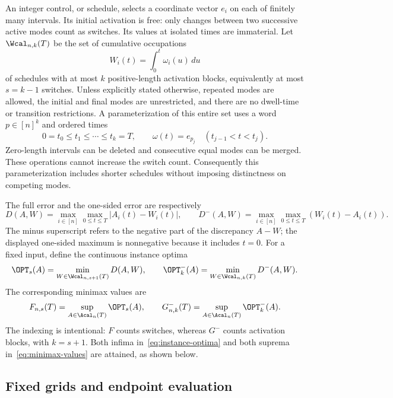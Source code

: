 An integer control, or schedule, selects a coordinate vector $e_i$ on each of
finitely many intervals. Its initial activation is free: only changes between
two successive active modes count as switches. Its values at isolated times
are immaterial. Let $\Wcal_{n,k}(T)$ be the set of cumulative occupations
\[
 W_i(t)=\int_0^t\omega_i(u)\,du
\]
of schedules with at most $k$ positive-length activation blocks, equivalently
at most $s=k-1$ switches. Unless explicitly stated otherwise, repeated modes
are allowed, the initial and final modes are unrestricted, and there are no
dwell-time or transition restrictions. A parameterization of this entire set
uses a word $p\in[n]^k$ and ordered times
\begin{equation}\label{eq:schedule-parameterization}
 0=t_0\le t_1\le\cdots\le t_k=T,\qquad
 \omega(t)=e_{p_j}\quad(t_{j-1}<t<t_j).
\end{equation}
Zero-length intervals can be deleted and consecutive equal modes can be
merged. These operations cannot increase the switch count. Consequently this
parameterization includes shorter schedules without imposing distinctness
on competing modes.

The full error and the one-sided error are respectively
\begin{equation}\label{eq:errors}
 D(A,W)=\max_{i\in[n]}\max_{0\le t\le T}|A_i(t)-W_i(t)|,
 \qquad
 D^-(A,W)=\max_{i\in[n]}\max_{0\le t\le T}(W_i(t)-A_i(t)).
\end{equation}
The minus superscript refers to the negative part of the discrepancy $A-W$;
the displayed one-sided maximum is nonnegative because it includes $t=0$.
For a fixed input, define the continuous instance optima
\begin{equation}\label{eq:instance-optima}
 \OPT_s(A)=\min_{W\in\Wcal_{n,s+1}(T)}D(A,W),\qquad
 \OPT^-_k(A)=\min_{W\in\Wcal_{n,k}(T)}D^-(A,W).
\end{equation}
The corresponding minimax values are
\begin{equation}\label{eq:minimax-values}
 F_{n,s}(T)=\sup_{A\in\Acal_n(T)}\OPT_s(A),\qquad
 G^-_{n,k}(T)=\sup_{A\in\Acal_n(T)}\OPT^-_k(A).
\end{equation}
The indexing is intentional: $F$ counts switches, whereas $G^-$ counts
activation blocks, with $k=s+1$. Both infima in~\eqref{eq:instance-optima}
and both suprema in~\eqref{eq:minimax-values} are attained, as shown below.

\subsection{Fixed grids and endpoint evaluation}

